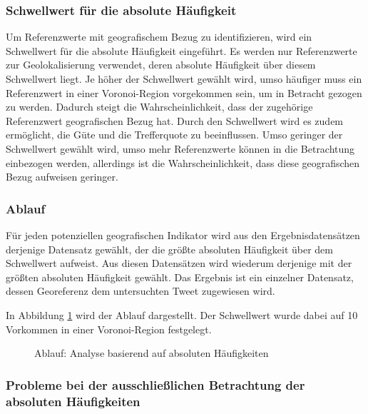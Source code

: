 			\subsubsection{Schwellwert für die absolute Häufigkeit} 

				Um Referenzwerte mit geografischem Bezug zu identifizieren, wird ein Schwellwert für die absolute Häufigkeit eingeführt.
				Es werden nur Referenzwerte zur Geolokalisierung verwendet, deren absolute Häufigkeit über diesem Schwellwert liegt.
				Je höher der Schwellwert gewählt wird, umso häufiger muss ein Referenzwert in einer Voronoi-Region vorgekommen sein, um in Betracht gezogen zu werden.
				Dadurch steigt die Wahrscheinlichkeit, dass der zugehörige Referenzwert geografischen Bezug hat. 
				Durch den Schwellwert wird es zudem ermöglicht, die Güte und die Trefferquote zu beeinflussen.
				Umso geringer der Schwellwert gewählt wird, umso mehr Referenzwerte können in die Betrachtung einbezogen werden, allerdings ist die Wahrscheinlichkeit, dass diese geografischen Bezug aufweisen geringer.  

			\subsubsection{Ablauf}

				Für jeden potenziellen geografischen Indikator wird aus den Ergebnisdatensätzen derjenige Datensatz gewählt, der die größte absoluten Häufigkeit über dem Schwellwert aufweist.
				Aus diesen Datensätzen wird wiederum derjenige mit der größten absoluten Häufigkeit gewählt. 
				Das Ergebnis ist ein einzelner Datensatz, dessen Georeferenz dem untersuchten Tweet zugewiesen wird.

				In Abbildung \ref{img:absHaufBsp} wird der Ablauf dargestellt.
				Der Schwellwert wurde dabei auf 10 Vorkommen in einer Voronoi-Region festgelegt. 
				
				\begin{figure}[!ht]
	
						\centering
						\caption{Ablauf: Analyse basierend auf absoluten Häufigkeiten}
						\label{img:absHaufBsp}
					
				\end{figure}

		\subsubsection{Probleme bei der ausschließlichen Betrachtung der absoluten Häufigkeiten} 

